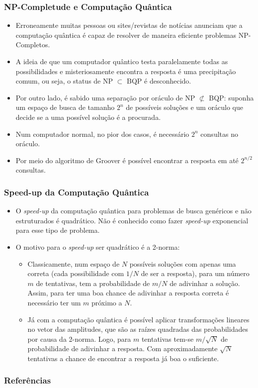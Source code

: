 \documentclass{beamer}
\begin{document}
\begin{frame}
\frametitle{NP-Completude e Computação Quântica} 
\begin{itemize}
  \item Erroneamente muitas pessoas ou sites/revistas de notícias
  anunciam que a computação quântica é capaz de resolver de maneira
  eficiente problemas NP-Completos.
  \item A ideia de que um computador quântico testa paralelamente todas
  as possibilidades e misteriosamente encontra a resposta é uma
  precipitação comum, ou seja, o status de NP $\subset$ BQP é
  desconhecido.
  \item Por outro lado, é sabido uma separação por oráculo de NP
  $\not \subset$ BQP: suponha um espaço de busca de tamanho $2^n$ de
  possíveis soluções e um oráculo que decide se a uma possível solução
  é a procurada.
  \item Num computador normal, no pior dos casos, é necessário $2^n$
  consultas no oráculo.
  \item Por meio do algoritmo de Groover \cite{gr:96} é possível
  encontrar a resposta em até $2^{n/2}$ consultas.
\end{itemize}
\end{frame}

\begin{frame}
\frametitle{Speed-up da Computação Quântica} 
\begin{itemize}
  \item O \textit{speed-up} da computação quântica para problemas de
  busca genéricos e não estruturados é quadrático. Não é conhecido
  como fazer \textit{speed-up} exponencial para esse tipo de problema.
  \item O motivo para o \textit{speed-up} ser quadrático é a 2-norma:
  \begin{itemize}
  \item Classicamente, num espaço de $N$ possíveis soluções com apenas
    uma correta (cada possibilidade com $1/N$ de ser a resposta), para
    um número $m$ de tentativas, tem a probabilidade de $m/N$ de
    adivinhar a solução. Assim, para ter uma boa chance de
    adivinhar a resposta correta é necessário ter um $m$ próximo a $N$.
  \item Já com a computação quântica é possível aplicar transformações
    lineares no vetor das amplitudes, que são as raízes quadradas das
    probabilidades por causa da 2-norma. Logo, para $m$ tentativas
    tem-se $m/\sqrt{N}$ de probabilidade de adivinhar a resposta. Com
    aproximadamente $\sqrt{N}$ tentativas a chance de encontrar a
    resposta já boa o suficiente.
  \end{itemize}
\end{itemize}
\end{frame}

\begin{frame}
  \frametitle{Referências}
   
  
\end{frame}
\end{document}
